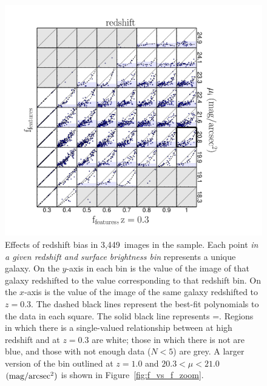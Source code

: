 \begin{figure}
\begin{center}
\includegraphics[scale=0.42]{figures/p_vs_p_SB_redshift.pdf}
\caption{Effects of redshift bias in 3,449~images in the \ferengi{} sample.
Each point \emph{in a given redshift and surface brightness bin} represents a
unique galaxy. On the $y$-axis in each bin is the \ffeatures{} value of the
image of that galaxy redshifted to the value corresponding to that redshift
bin. On the $x$-axis is the \ffeatures{} value of the image of the same galaxy
redshifted to $z=0.3$. The dashed black lines represent the best-fit
polynomials to the data in each square. The solid black line represents
\ffeaturesz=\ffeaturesrest. Regions in which there is a single-valued
relationship between \ffeatures{} at high redshift and at $z=0.3$ are white;
those in which there is not are blue, and those with not enough data ($N<5$)
are grey. A larger version of the bin outlined at $z=1.0$ and $20.3 < \mu <
21.0$ $\rm (mag/arcsec^2)$ is shown in Figure~\ref{fig:f_vs_f_zoom}.}
\label{fig:f_vs_f}
\end{center}
\end{figure}

